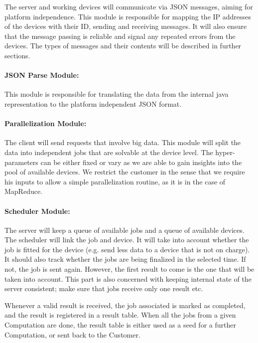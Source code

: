 \documentclass[a4paper,10pt]{article}
\begin{document}
The server and working devices will communicate via JSON messages, aiming for platform independence. This module is responsible for mapping the IP addresses of the devices with their ID, sending and receiving messages. It will also ensure that the message passing is reliable and signal any repeated errors from the devices. The types of messages and their contents will be described in further sections.

\paragraph{JSON Parse Module:}

This module is responsible for translating the data from the internal java representation to the platform independent JSON format. 

\paragraph{Parallelization Module:}

The client will send requests that involve big data. This module will split the data into independent jobs that are solvable at the device level. The hyper-parameters can be either fixed or vary as we are able to gain insights into the pool of available devices. We restrict the customer in the sense that we require his inputs to allow a simple parallelization routine, as it is in the case of MapReduce. 

\paragraph{Scheduler Module:}

The server will keep a queue of available jobs and a queue of available devices. The scheduler will link the job and device. It will take into account whether the job is fitted for the device (e.g. send less data to a device that is not on charge). It should also track whether the jobs are being finalized in the selected time. If not, the job is sent again. However, the first result to come is the one that will be taken into account. This part is also concerned with keeping internal state of the server consistent; make sure that jobs receive only one result etc.

Whenever a valid result is received, the job associated is marked as completed, and the result is registered in a result table. When all the jobs from a given Computation are done, the result table is either used as a seed for a further Computation, or sent back to the Customer. 
\end{document}
